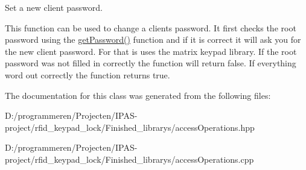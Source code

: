 Set a new client password. 

This function can be used to change a clients password. It first checks the root password using the \hyperlink{classaccess_operations_a23a9545b9b8636b995aa6e3d007ea524}{get\+Password()} function and if it is correct it will ask you for the new client password. For that is uses the matrix keypad library. If the root password was not filled in correctly the function will return false. If everything word out correctly the function returns true. 

The documentation for this class was generated from the following files\+:\begin{DoxyCompactItemize}
\item 
D\+:/programmeren/\+Projecten/\+I\+P\+A\+S-\/project/rfid\+\_\+keypad\+\_\+lock/\+Finished\+\_\+librarys/access\+Operations.\+hpp\item 
D\+:/programmeren/\+Projecten/\+I\+P\+A\+S-\/project/rfid\+\_\+keypad\+\_\+lock/\+Finished\+\_\+librarys/access\+Operations.\+cpp\end{DoxyCompactItemize}

